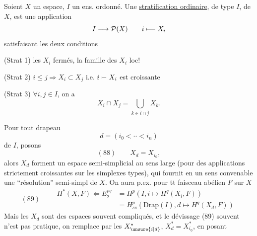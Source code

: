 
Soient $X$ un espace, $I$ un ens. ordonné.
Une \uline{stratification ordinaire}, de type $I$, de $X$, est une application
\[I\longrightarrow\mathcal P(X)\qquad i\mathrel{\mapstochar\relbar\joinrel\relbar}X_i\]
satisfaisant les deux conditions

(Strat 1) les $X_i$ fermés, la famille des $X_i$  loc! 

(Strat 2) $i\leq j\Longrightarrow X_i\subset X_j$ i.e. $i\mathrel{\mapstochar\relbar}X_i$ est croissante

(Strat 3) $\forall i,j\in I$, on a
\[X_i\cap X_j=\bigcup_{k\in\bar i\cap\bar j}X_k.\]

Pour tout drapeau
\[d=(i_0<\cdotp\cdotp<i_n)\]
de $I$, posons
\[(88)\qquad X_d=X_{i_0},\]
alors  $X_d$ forment un  espace semi-simplicial  au sens large (pour des applications strictement croissantes sur les simplexes types), qui fournit en un sens convenable une ``résolution'' semi-simpl de $X$. On aura p.ex. pour tt faisceau abélien $F$ sur $X$
\[
(89)\qquad\begin{aligned}
H^*(X,F)\Longleftarrow E_2^{pq}&=H^p(I,i\mapsto H^q(X_i,F))\\
&=H^p_{ss}(\mathrm{Drap}(I),d\mapsto H^q(X_d,F))
\end{aligned}
\]
Mais les  $X_d$ sont des espaces souvent compliqués, et le dévissage (89) souvent n'est pas pratique, on remplace par les $X_{\unsure{i|d}}^*$, $X_d^*=X_{i_0}^*$, en posant
